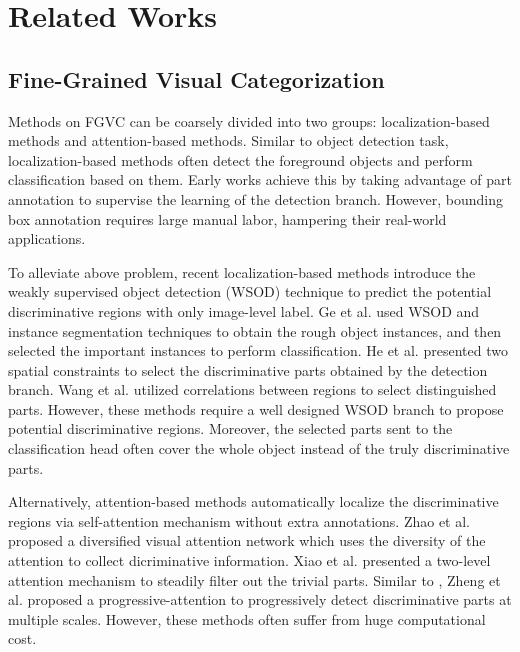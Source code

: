 \documentclass{bmvc2k}
\begin{document}
\section{Related Works}
\subsection{Fine-Grained Visual Categorization}
Methods on FGVC can be coarsely divided into two groups: localization-based methods and attention-based methods. Similar to object detection task, localization-based methods often detect the foreground objects and perform classification based on them. Early works \cite{huang2016part,berg2013poof,xie2013hierarchical} achieve this by taking advantage of part annotation to supervise the learning of the detection branch. However, bounding box annotation requires large manual labor, hampering their real-world applications. 
\par
To alleviate above problem, recent localization-based methods introduce the weakly supervised object detection (WSOD) technique to predict the potential discriminative regions with only image-level label. Ge et al. \cite{ge2019weakly} used WSOD and instance segmentation techniques to obtain the rough object instances, and then selected the important instances to perform classification. He et al. \cite{he2017weakly} presented two spatial constraints to select the discriminative parts obtained by the detection branch. Wang et al. \cite{wang2019weakly} utilized correlations between regions to select distinguished parts. However, these methods require a well designed WSOD branch to propose potential discriminative regions. Moreover, the selected parts sent to the classification head often cover the whole object instead of the truly discriminative parts.
\par
Alternatively, attention-based methods automatically localize the discriminative regions via self-attention mechanism without extra annotations. Zhao et al. \cite{zhao2017diversified} proposed a diversified visual attention network which uses the diversity of the attention to collect dicriminative information. Xiao et al. \cite{xiao2015application} presented a two-level attention mechanism to steadily filter out the trivial parts. Similar to \cite{xiao2015application}, Zheng et al. \cite{zheng2021rethinking} proposed a progressive-attention to progressively detect discriminative parts at multiple scales. However, these methods often suffer from huge computational cost. 
\end{document}
